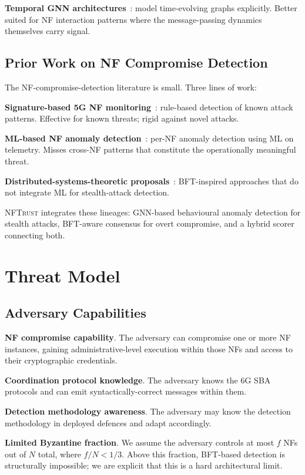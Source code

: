 \documentclass[sigconf,nonacm]{acmart}
\begin{document}
\textbf{Temporal GNN architectures}~\cite{rossi2020tgn,xu2020tgat}:
model time-evolving graphs explicitly. Better suited for
NF interaction patterns where the message-passing dynamics
themselves carry signal.

\subsection{Prior Work on NF Compromise Detection}

The NF-compromise-detection literature is small. Three lines of
work:

\textbf{Signature-based 5G NF monitoring}~\cite{park2024sbathreat,
ericsson20245gsec}: rule-based detection of known attack
patterns. Effective for known threats; rigid against novel attacks.

\textbf{ML-based NF anomaly detection}~\cite{nguyen2024nfanomaly}:
per-NF anomaly detection using ML on telemetry. Misses cross-NF
patterns that constitute the operationally meaningful threat.

\textbf{Distributed-systems-theoretic proposals}~\cite{wong2024oranresilience,
chen20246gdistsec}: BFT-inspired approaches that do not integrate
ML for stealth-attack detection.

\textsc{NFTrust} integrates these lineages: GNN-based behavioural
anomaly detection for stealth attacks, BFT-aware consensus for
overt compromise, and a hybrid scorer connecting both.

\section{Threat Model}

\subsection{Adversary Capabilities}

\textbf{NF compromise capability}. The adversary can compromise
one or more NF instances, gaining administrative-level execution
within those NFs and access to their cryptographic credentials.

\textbf{Coordination protocol knowledge}. The adversary knows the
6G SBA protocols and can emit syntactically-correct messages
within them.

\textbf{Detection methodology awareness}. The adversary may know
the detection methodology in deployed defences and adapt
accordingly.

\textbf{Limited Byzantine fraction}. We assume the adversary
controls at most $f$ NFs out of $N$ total, where $f/N < 1/3$.
Above this fraction, BFT-based detection is structurally
impossible; we are explicit that this is a hard architectural
limit.
\end{document}
